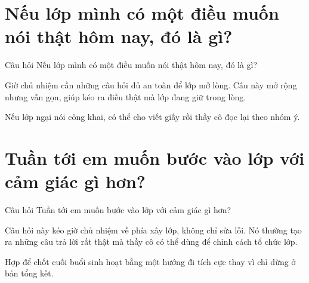 \section{Nếu lớp mình có một điều muốn nói thật hôm nay, đó là gì?}
\begin{cauhoibox}{Câu hỏi}
Nếu lớp mình có một điều muốn nói thật hôm nay, đó là gì?
\end{cauhoibox}
\begin{taisaocoich}
Giờ chủ nhiệm cần những câu hỏi đủ an toàn để lớp mở lòng. Câu này mở rộng nhưng vẫn gọn, giúp kéo ra điều thật mà lớp đang giữ trong lòng.
\end{taisaocoich}
\begin{goiybien}
Nếu lớp ngại nói công khai, có thể cho viết giấy rồi thầy cô đọc lại theo nhóm ý.
\end{goiybien}
\ngancach

\section{Tuần tới em muốn bước vào lớp với cảm giác gì hơn?}
\begin{cauhoibox}{Câu hỏi}
Tuần tới em muốn bước vào lớp với cảm giác gì hơn?
\end{cauhoibox}
\begin{taisaocoich}
Câu hỏi này kéo giờ chủ nhiệm về phía xây lớp, không chỉ sửa lỗi. Nó thường tạo ra những câu trả lời rất thật mà thầy cô có thể dùng để chỉnh cách tổ chức lớp.
\end{taisaocoich}
\begin{goiybien}
Hợp để chốt cuối buổi sinh hoạt bằng một hướng đi tích cực thay vì chỉ dừng ở bản tổng kết.
\end{goiybien}
